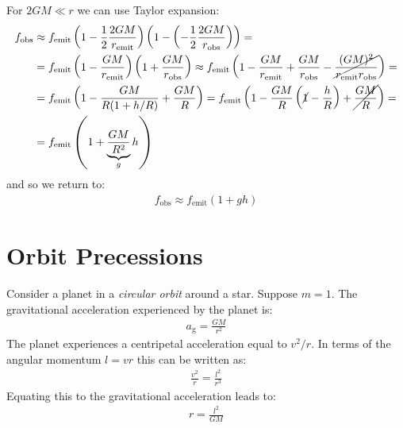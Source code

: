\documentclass[../template.tex]{subfiles}
\begin{document}
For $2GM \ll r$ we can use Taylor expansion:
\begin{align*}
    f_{\mathrm{obs} } &\approx f_{\mathrm{emit} } \left(1 - \frac{1}{2} \frac{2 GM}{r_{\mathrm{emit} }}  \right) \left(1 - \left(-\frac{1}{2} \frac{2 GM}{r_{\mathrm{obs} }} \right)\right) =\\
    &= f_{\mathrm{emit} } \left(1-\frac{GM}{r_{\mathrm{emit} }} \right)\left(1 + \frac{GM}{r_{\mathrm{obs} }} \right) \approx f_{\mathrm{emit} } \left(1 - \frac{GM}{r_{\mathrm{emit} }} + \frac{GM}{r_{\mathrm{obs} }} - \cancel{\frac{(GM)^2}{r_{\mathrm{emit} }r_{\mathrm{obs} }}}   \right) =\\
    &= f_{\mathrm{emit} }\left(1-\frac{GM}{R(1+h/R)}  + \frac{GM}{R} \right) = f_{\mathrm{emit} } \left(1-\frac{GM}{R} \left(\cancel{1}-\frac{h}{R} \right) + \cancel{\frac{GM}{R}} 
\right) = \\
&= f_{\mathrm{emit} } \left(1 + \underbrace{\frac{GM}{R^2}}_{g}  h \right) 
\end{align*}
and so we return to:
\begin{align*}
    f_{\mathrm{obs} } \approx f_{\mathrm{emit} } \left(1 + g h\right)
\end{align*}

\section{Orbit Precessions}
Consider a planet in a \textit{circular orbit} around a star. Suppose $m = 1$. The gravitational acceleration experienced by the planet is:
\begin{align*}
    a_{\mathrm{g} } = \frac{GM}{r^2} 
\end{align*} 
The planet experiences a centripetal acceleration equal to $v^2/r$. In terms of the angular momentum $l= vr$ this can be written as:
\begin{align*}
    \frac{v^2}{r} = \frac{l^2}{r^3}  
\end{align*}  
Equating this to the gravitational acceleration leads to:
\begin{align*}
    r = \frac{l^2}{GM} 
\end{align*}
\end{document}
